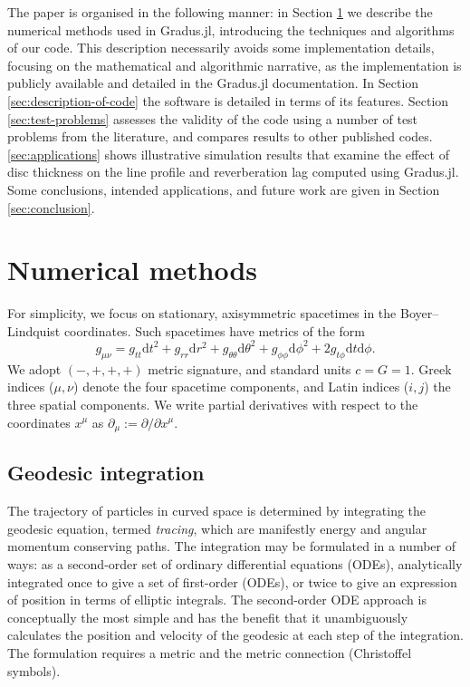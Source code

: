 \documentclass[fleqn,usenatbib]{mnras}
\newcommand{\Gradus}{{\sc Gradus.jl}\xspace}
\renewcommand{\d}{\text{d}}
\begin{document}
The paper is organised in the following manner: in Section
\ref{sec:numerical-methods} we describe the numerical methods used in \Gradus,
introducing the techniques and algorithms of our code. This description
necessarily avoids some implementation details, focusing on the mathematical and
algorithmic narrative, as the implementation is publicly available and detailed
in the \Gradus documentation. In Section \ref{sec:description-of-code} the
software is detailed in terms of its features. Section \ref{sec:test-problems}
assesses the validity of the code using a number of test problems from the
literature, and compares results to other published codes.
\ref{sec:applications} shows illustrative simulation results that examine the
effect of disc thickness on the line profile and reverberation lag computed
using \Gradus. Some conclusions, intended applications, and future work are
given in Section \ref{sec:conclusion}.

\section{Numerical methods}
\label{sec:numerical-methods}

For simplicity, we focus on stationary, axisymmetric spacetimes in the
Boyer--Lindquist coordinates. Such spacetimes have metrics of the form
\begin{equation}
\label{eq:stationary_axisymmetric_metric}
    g_{\mu\nu}
    = g_{tt} \d t^2
    + g_{rr} \d r^2
    + g_{\theta\theta} \d \theta^2
    + g_{\phi\phi} \d \phi^2
    + 2g_{t\phi} \d t \d \phi.
\end{equation}
We adopt $(-, +, +, +)$ metric signature, and standard units $c = G
= 1$. Greek indices ($\mu, \nu$) denote the four spacetime components, and Latin
indices ($i, j$) the three spatial components. We write partial derivatives with
respect to the coordinates $x^\mu$ as $\partial_\mu := \partial / \partial
x^\mu$.

\subsection{Geodesic integration}

The trajectory of particles in curved space is determined by integrating the
geodesic equation, termed \emph{tracing}, which are manifestly energy and
angular momentum conserving paths. The integration may be formulated in a number
of ways: as a second-order set of ordinary differential equations (ODEs),
analytically integrated once to give a set of first-order (ODEs), or twice to
give an expression of position in terms of elliptic integrals. The second-order
ODE approach is conceptually the most simple and has the benefit that it
unambiguously calculates the position and velocity of the geodesic at each step
of the integration. The formulation requires a metric and
the metric connection (Christoffel symbols).
\end{document}
